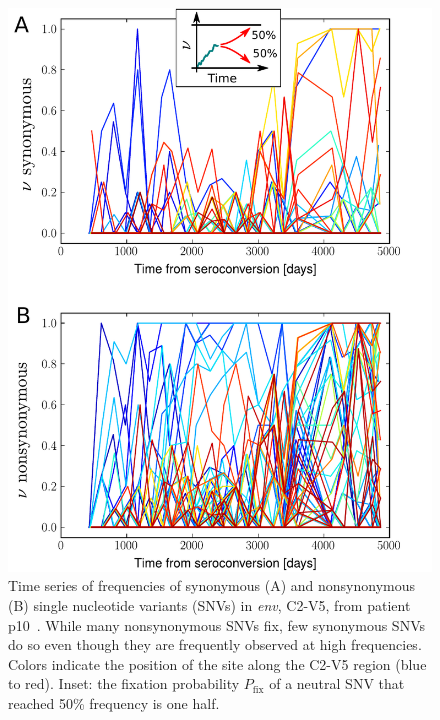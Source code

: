 \documentclass[11pt]{article}
\newcommand{\pfix}{P_{\mathrm{fix}}}
\newcommand{\env}{\textit{env}}
\newcommand{\shankaregion}{C2-V5}
\begin{document}
\begin{figure}
\begin{center}
\includegraphics[width=0.6\linewidth]{fig1}
\caption{Time series of frequencies
of synonymous (A) and nonsynonymous (B) single nucleotide variants (SNVs) in \env, 
\shankaregion, from patient p10~\cite{shankarappa_consistent_1999}.
While many nonsynonymous SNVs fix, few synonymous
SNVs do so even though they are frequently observed at high
frequencies. Colors indicate the position of the site along the \shankaregion{} region
(blue to red). Inset: the fixation probability $\pfix$ of a neutral
SNV that reached 50\% frequency is one half.}
\label{fig:aft}
\end{center}
\end{figure}
\end{document}
